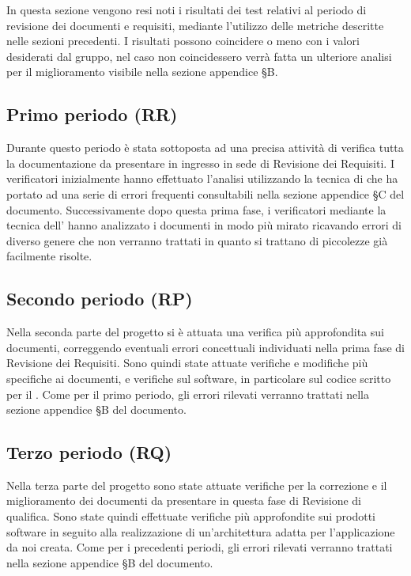 \documentclass[../piano-di-qualifica.tex]{subfiles}
\begin{document}
In questa sezione vengono resi noti i risultati dei test relativi al periodo di revisione dei documenti e requisiti, mediante l'utilizzo delle metriche descritte nelle sezioni precedenti.
I risultati possono coincidere o meno con i valori desiderati dal gruppo, nel caso non coincidessero verrà fatta un ulteriore analisi per il miglioramento visibile nella sezione appendice §B.

\subsection{Primo periodo (RR)}
\label{sub:primo_periodo}
Durante questo periodo è stata sottoposta ad una precisa attività di verifica tutta la documentazione da presentare in ingresso in sede di Revisione dei Requisiti.
I verificatori inizialmente hanno effettuato l'analisi utilizzando la tecnica di  che ha portato ad una serie di errori frequenti consultabili nella sezione appendice §C del documento.
Successivamente dopo questa prima fase, i verificatori mediante la tecnica dell' hanno analizzato i documenti in modo più mirato ricavando errori di diverso genere che non verranno trattati in quanto si trattano di piccolezze già facilmente risolte.


\subsection{Secondo periodo (RP)}
\label{sub:secondo_periodo}
Nella seconda parte del progetto si è attuata una verifica più approfondita sui documenti, correggendo eventuali errori concettuali individuati nella prima fase di Revisione dei Requisiti.
Sono quindi state attuate verifiche e modifiche più specifiche ai documenti, e verifiche sul software, in particolare sul codice scritto per il .
Come per il primo periodo, gli errori rilevati verranno trattati nella sezione appendice §B del documento.
\label{sub:secondo_periodo}


\subsection{Terzo periodo (RQ)}
\label{sub:terzo_periodo}
Nella terza parte del progetto sono state attuate verifiche per la correzione e il miglioramento dei documenti da presentare in questa fase di Revisione di qualifica.
Sono state quindi effettuate verifiche più approfondite sui prodotti software in seguito alla realizzazione di un'architettura adatta per l'applicazione da noi creata.
Come per i precedenti periodi, gli errori rilevati verranno trattati nella sezione appendice §B del documento. 

\end{document}
